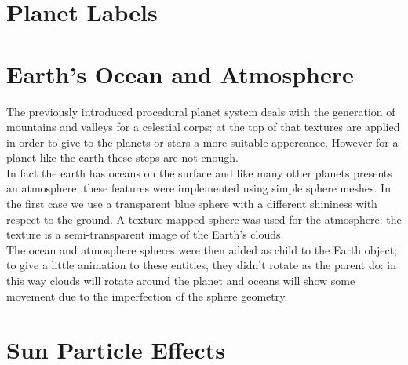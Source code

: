 \documentclass[paper=a4, fontsize=11pt]{scrartcl} %
\numberwithin{equation}{section} %
\numberwithin{figure}{section} %
\numberwithin{table}{section} %
\theoremstyle{definition}
\begin{document}

\section{Planet Labels}




\section{Earth's Ocean and Atmosphere}

The previously introduced procedural planet system deals with the generation of mountains and valleys for a celestial corps; at the top of that textures are applied in order to give to the planets or stars a more suitable appereance. However for a planet like the earth these steps are not enough.\\
In fact the earth has oceans on the surface and like many other planets presents an atmosphere; these features were implemented using simple sphere meshes. In the first case we use a transparent blue sphere with a different shininess with respect to the ground. A texture mapped sphere was used for the atmosphere: the texture is a semi-transparent image of the Earth's clouds.\\
The ocean and atmosphere spheres were then added as child to the Earth object; to give a little animation to these entities, they didn't rotate as the parent do: in this way clouds will rotate around the planet and oceans will show some movement due to the imperfection of the sphere geometry.


\section{Sun Particle Effects}
\end{document}

